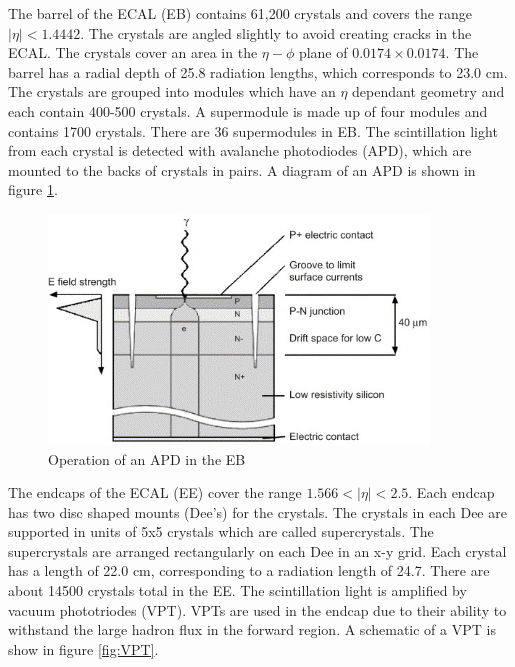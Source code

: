 \documentclass[oneside, letterpaper, oldfontcommands]{memoir}
\begin{document}
\qquad The barrel of the ECAL (EB) contains 61,200 crystals and covers the range $|\eta| < 1.4442$. The crystals are angled slightly to avoid creating cracks in the ECAL. The crystals cover an area in the $\eta - \phi$ plane of $0.0174 \times 0.0174$. The barrel has a radial depth of 25.8 radiation lengths, which corresponds to 23.0 cm. The crystals are grouped into modules which have an $\eta$ dependant geometry and each contain 400-500 crystals. A supermodule is made up of four modules and contains 1700 crystals. There are 36 supermodules in EB. The scintillation light from each crystal is detected with avalanche photodiodes (APD), which are mounted to the backs of crystals in pairs. A diagram of an APD is shown in figure \ref{fig:APD}. 

\begin{figure}[here]
\includegraphics[width=0.9\textwidth]{apd.jpg}
\caption{Operation of an APD in the EB  \cite{Brown:2007cg}}
\label{fig:APD}
\end{figure}


\qquad The endcaps of the ECAL (EE) cover the range $1.566 < |\eta| < 2.5$. Each endcap has two disc shaped mounts (Dee's) for the crystals. The crystals in each Dee are supported in units of 5x5 crystals which are called supercrystals. The supercrystals are arranged rectangularly on each Dee in an x-y grid. Each crystal has a length of 22.0 cm, corresponding to a radiation length of 24.7. There are about 14500 crystals total in the EE. The scintillation light is amplified by vacuum phototriodes (VPT). VPTs are used in the endcap due to their ability to withstand the large hadron flux in the forward region. A schematic of a VPT is show in figure \ref{fig:VPT}.
\end{document}
